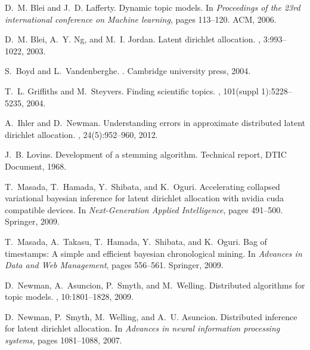 \documentclass[10pt,conference]{IEEEtran}
\begin{document}

\begin{thebibliography}{10}

D.~M. Blei and J.~D. Lafferty.
\newblock Dynamic topic models.
\newblock In {\em Proceedings of the 23rd international conference on Machine
  learning}, pages 113--120. ACM, 2006.

D.~M. Blei, A.~Y. Ng, and M.~I. Jordan.
\newblock Latent dirichlet allocation.
, 3:993--1022, 2003.

S.~Boyd and L.~Vandenberghe.
.
\newblock Cambridge university press, 2004.

T.~L. Griffiths and M.~Steyvers.
\newblock Finding scientific topics.
, 101(suppl
  1):5228--5235, 2004.

A.~Ihler and D.~Newman.
\newblock Understanding errors in approximate distributed latent dirichlet
  allocation.
,
  24(5):952--960, 2012.

J.~B. Lovins.
\newblock Development of a stemming algorithm.
\newblock Technical report, DTIC Document, 1968.

T.~Masada, T.~Hamada, Y.~Shibata, and K.~Oguri.
\newblock Accelerating collapsed variational bayesian inference for latent
  dirichlet allocation with nvidia cuda compatible devices.
\newblock In {\em Next-Generation Applied Intelligence}, pages 491--500.
  Springer, 2009.

T.~Masada, A.~Takasu, T.~Hamada, Y.~Shibata, and K.~Oguri.
\newblock Bag of timestamps: A simple and efficient bayesian chronological
  mining.
\newblock In {\em Advances in Data and Web Management}, pages 556--561.
  Springer, 2009.

D.~Newman, A.~Asuncion, P.~Smyth, and M.~Welling.
\newblock Distributed algorithms for topic models.
, 10:1801--1828, 2009.

D.~Newman, P.~Smyth, M.~Welling, and A.~U. Asuncion.
\newblock Distributed inference for latent dirichlet allocation.
\newblock In {\em Advances in neural information processing systems}, pages
  1081--1088, 2007.


\end{thebibliography}
\end{document}

